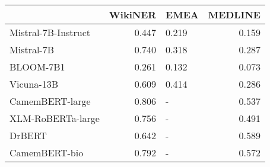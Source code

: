 \begin{tabular}{lrlr}
\toprule
{} &  WikiNER &   EMEA &  MEDLINE \\
\midrule
Mistral-7B-Instruct &    0.447 &  0.219 &    0.159 \\
Mistral-7B          &    0.740 &  0.318 &    0.287 \\
BLOOM-7B1           &    0.261 &  0.132 &    0.073 \\
Vicuna-13B          &    0.609 &  0.414 &    0.286 \\
CamemBERT-large     &    0.806 &      - &    0.537 \\
XLM-RoBERTa-large   &    0.756 &      - &    0.491 \\
DrBERT              &    0.642 &      - &    0.589 \\
CamemBERT-bio       &    0.792 &      - &    0.572 \\
\bottomrule
\end{tabular}
